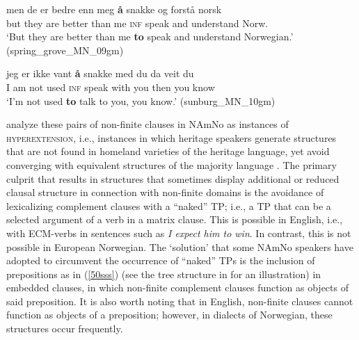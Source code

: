 \documentclass[output=paper,colorlinks,citecolor=brown]{langscibook}
\begin{document}
\begin{exe}

\item \label{60sss}

\begin{xlist}

\item \gll men de er bedre enn meg \textbf{å} snakke og forstå norsk  \\
        but they are better than me \textsc{inf} speak and understand Norw.\\
         \glt `But they are better than me \textbf{to} speak and understand Norwegian.' \hfill(spring\_grove\_MN\_09gm)\label{ex61}

\item \gll jeg er ikke vant \textbf{å} snakke med du da veit du \\
        I am not used \textsc{inf} speak with you then you know \\
         \glt `I'm not used \textbf{to} talk to you, you know.' \hfill(sunburg\_MN\_10gm)\label{ex125}

\end{xlist}

\end{exe}

\citet{putsoft} analyze these pairs of non-finite clauses in NAmNo as instances of \textsc{hyperextension}, i.e., instances in which heritage speakers generate structures that are not found in homeland varieties of the heritage language, yet avoid converging with equivalent structures of the majority language \citep{kupisch2014adjective,putnamhoff21}. The primary culprit that results in structures that sometimes display additional or reduced clausal structure in connection with non-finite domains is the avoidance of lexicalizing complement clauses with a “naked” TP; i.e., a TP that can be a selected argument of a verb in a matrix clause. This is possible in English, i.e., with ECM-verbs in sentences such as \textit{I expect him to win}. In contrast, this is not possible in European Norwegian. The `solution' that some NAmNo speakers have adopted to circumvent the occurrence of “naked” TPs is the inclusion of prepositions as in (\ref{50sss}) (see the tree structure in  for an illustration) in embedded clauses, in which non-finite complement clauses function as objects of said preposition. It is also worth noting that in English, non-finite clauses cannot function as objects of a preposition; however, in dialects of Norwegian, these structures occur frequently. 
\end{document}
